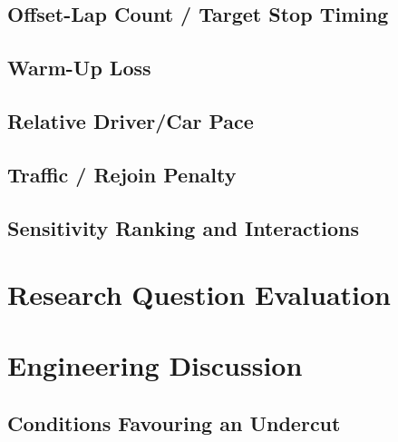 \subsection{Offset-Lap Count / Target Stop Timing}

\subsection{Warm-Up Loss}

\subsection{Relative Driver/Car Pace}

\subsection{Traffic / Rejoin Penalty}

\subsection{Sensitivity Ranking and Interactions}

\section{Research Question Evaluation}
\label{sec:rq-evaluation}


\section{Engineering Discussion}
\label{sec:engineering-discussion}

\subsection{Conditions Favouring an Undercut}

